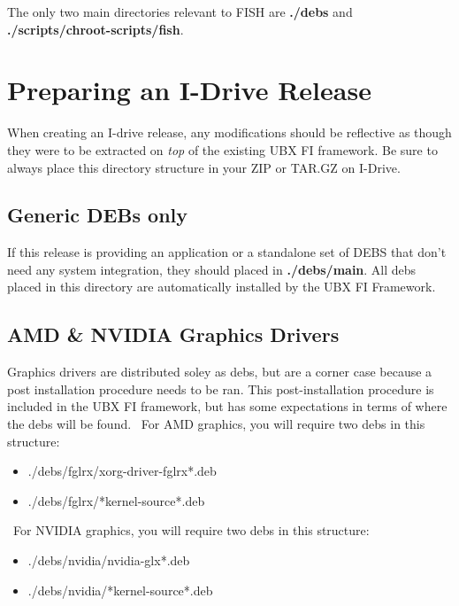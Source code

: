 \documentclass[letterpaper,10pt,titlepage]{article}
\begin{document}
The only two main directories relevant to FISH are \textbf{./debs} and \textbf{./scripts/chroot-scripts/fish}.

\section{Preparing an I-Drive Release}
When creating an I-drive release, any modifications should be reflective as though they were to be extracted on \textit{top} of  the existing UBX FI framework.  Be sure to always place this directory structure in your ZIP or TAR.GZ on I-Drive.

\subsection{Generic DEBs only}
If this release is providing an application or a standalone set of DEBS that don't need any system integration, they should placed in
\textbf{./debs/main}.  All debs placed in this directory are automatically installed by the UBX FI Framework.

\subsection{ AMD \& NVIDIA Graphics Drivers}
Graphics drivers are distributed soley as debs, but are a corner case because a post installation procedure needs to be ran.  This post-installation procedure is included in the UBX FI framework, but has some expectations in terms of where the debs will be found.
\
For AMD graphics, you will require two debs in this structure:
\begin{itemize}
\item ./debs/fglrx/xorg-driver-fglrx*.deb
\item ./debs/fglrx/*kernel-source*.deb
\end{itemize}
\
For NVIDIA graphics, you will require two debs in this structure:
\begin{itemize}
\item ./debs/nvidia/nvidia-glx*.deb
\item ./debs/nvidia/*kernel-source*.deb
\end{itemize}
\end{document}
